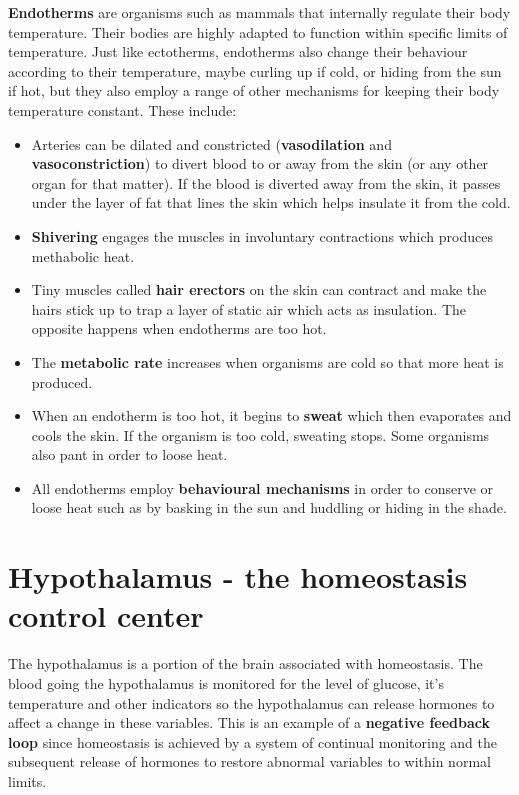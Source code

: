 \documentclass{article}
\begin{document}
{\bf Endotherms} are organisms such as mammals that internally regulate their
body temperature. Their bodies are highly adapted to function within specific
limits of temperature. Just like ectotherms, endotherms also change their
behaviour according to their temperature, maybe curling up if cold, or hiding
from the sun if hot, but they also employ a range of other mechanisms for
keeping their body temperature constant. These include:

\begin{itemize}

	\item Arteries can be dilated and constricted ({\bf vasodilation} and {\bf
	vasoconstriction}) to divert blood to or away from the skin (or any other
	organ for that matter). If the blood is diverted away from the skin, it
	passes under the layer of fat that lines the skin which helps insulate it
	from the cold.

	\item{\bf Shivering} engages the muscles in involuntary contractions which
	produces methabolic heat.

	\item Tiny muscles called {\bf hair erectors} on the skin can contract and
	make the hairs stick up to trap a layer of static air which acts as
	insulation. The opposite happens when endotherms are too hot.

	\item The {\bf metabolic rate} increases when organisms are cold so that
	more heat is produced.

	\item When an endotherm is too hot, it begins to {\bf sweat} which then
	evaporates and cools the skin. If the organism is too cold, sweating stops.
	Some organisms also pant in order to loose heat.

	\item All endotherms employ {\bf behavioural mechanisms} in order to
	conserve or loose heat such as by basking in the sun and huddling or hiding
	in the shade.

\end{itemize}

\section*{Hypothalamus - the homeostasis control center}

The hypothalamus is a portion of the brain associated with homeostasis. The
blood going the hypothalamus is monitored for the level of glucose, it's
temperature and other indicators so the hypothalamus can release hormones to
affect a change in these variables. This is an example of a {\bf negative
feedback loop} since homeostasis is achieved by a system of continual monitoring
and the subsequent release of hormones to restore abnormal variables to within
normal limits.
\end{document}
